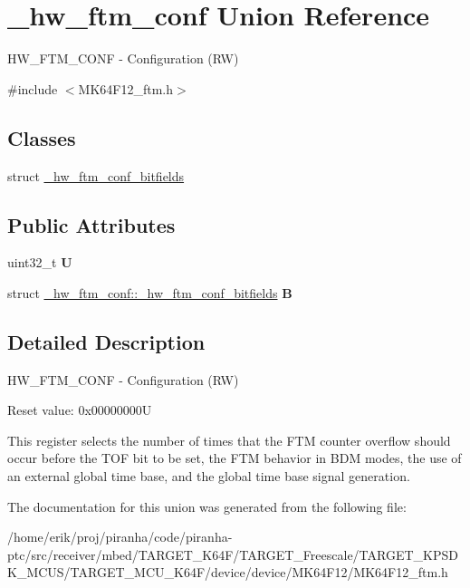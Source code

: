 \hypertarget{union__hw__ftm__conf}{}\section{\+\_\+hw\+\_\+ftm\+\_\+conf Union Reference}
\label{union__hw__ftm__conf}


H\+W\+\_\+\+F\+T\+M\+\_\+\+C\+O\+NF -\/ Configuration (RW)  




{\ttfamily \#include $<$M\+K64\+F12\+\_\+ftm.\+h$>$}

\subsection*{Classes}
\begin{DoxyCompactItemize}
\item 
struct \hyperlink{struct__hw__ftm__conf_1_1__hw__ftm__conf__bitfields}{\+\_\+hw\+\_\+ftm\+\_\+conf\+\_\+bitfields}
\end{DoxyCompactItemize}
\subsection*{Public Attributes}
\begin{DoxyCompactItemize}
\item 
uint32\+\_\+t {\bfseries U}\hypertarget{union__hw__ftm__conf_aae8c557a114e38e6d72d382dea3a9716}{}\label{union__hw__ftm__conf_aae8c557a114e38e6d72d382dea3a9716}

\item 
struct \hyperlink{struct__hw__ftm__conf_1_1__hw__ftm__conf__bitfields}{\+\_\+hw\+\_\+ftm\+\_\+conf\+::\+\_\+hw\+\_\+ftm\+\_\+conf\+\_\+bitfields} {\bfseries B}\hypertarget{union__hw__ftm__conf_a7187ba386ddf39f57e2ee107953b0d19}{}\label{union__hw__ftm__conf_a7187ba386ddf39f57e2ee107953b0d19}

\end{DoxyCompactItemize}


\subsection{Detailed Description}
H\+W\+\_\+\+F\+T\+M\+\_\+\+C\+O\+NF -\/ Configuration (RW) 

Reset value\+: 0x00000000U

This register selects the number of times that the F\+TM counter overflow should occur before the T\+OF bit to be set, the F\+TM behavior in B\+DM modes, the use of an external global time base, and the global time base signal generation. 

The documentation for this union was generated from the following file\+:\begin{DoxyCompactItemize}
\item 
/home/erik/proj/piranha/code/piranha-\/ptc/src/receiver/mbed/\+T\+A\+R\+G\+E\+T\+\_\+\+K64\+F/\+T\+A\+R\+G\+E\+T\+\_\+\+Freescale/\+T\+A\+R\+G\+E\+T\+\_\+\+K\+P\+S\+D\+K\+\_\+\+M\+C\+U\+S/\+T\+A\+R\+G\+E\+T\+\_\+\+M\+C\+U\+\_\+\+K64\+F/device/device/\+M\+K64\+F12/M\+K64\+F12\+\_\+ftm.\+h\end{DoxyCompactItemize}
